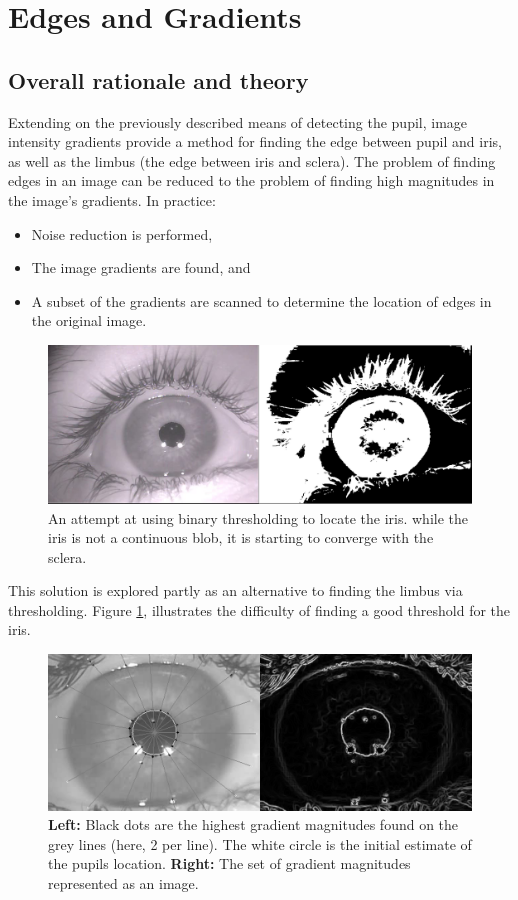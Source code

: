 \pagebreak
\section{Edges and Gradients}
\subsection{Overall rationale and theory}
Extending on the previously described means of detecting the pupil, image
intensity gradients provide a method for finding the edge between pupil and
iris, as well as the limbus (the edge between iris and sclera). The problem of
finding edges in an image can be reduced to the problem of finding high
magnitudes in the image's gradients.
In practice:
\begin{itemize}
	\item Noise reduction is performed,
	\item The image gradients are found, and
	\item A subset of the gradients are scanned to determine the location of edges in the
original image.
\end{itemize}

\begin{figure}[htbp]
\includegraphics{pics/iris_threshold.png}
\caption{An attempt at using binary thresholding to locate the iris.
while the iris is not a continuous blob, it is starting to converge with the sclera.}
\label{fig:iristhresh}
\end{figure}

This solution is explored partly as an alternative to finding the limbus via
thresholding. Figure \ref{fig:iristhresh}, illustrates the difficulty of finding a good threshold for the iris. 


\begin{figure}[htbp]
\includegraphics{pics/normallines_with_maxima_vs_gradient.png}
\caption{\textbf{Left:} Black dots are the highest gradient magnitudes found on the grey
lines (here, 2 per line). The white circle is the initial estimate of the
pupils location. \textbf{Right:} The set of gradient magnitudes represented as an image.}
\label{fig:normalsVsGradient}
\end{figure}


